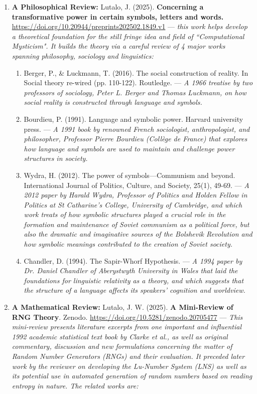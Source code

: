 \documentclass[a4paper]{article}
\begin{document}
\begin{enumerate}
\item{ \textbf{A Philosophical Review:} Lutalo, J. (2025). \textbf{Concerning a transformative power in certain symbols, letters and words.} \url{https://doi.org/10.20944/preprints202502.1849.v1} --- \textit{this work helps develop a theoretical foundation for the still fringe idea and field of ``Computational Mysticism". It builds the theory via a careful review of 4 major works spanning philosophy, sociology and linguistics:}
\begin{enumerate}
\item Berger, P., \& Luckmann, T. (2016). The social construction of reality. In Social theory re-wired (pp. 110-122). Routledge. --- \textit{A 1966 treatise by two professors of sociology, Peter L.
Berger and Thomas Luckmann, on how social reality is constructed through language and symbols.}
\item Bourdieu, P. (1991). Language and symbolic power. Harvard university press. --- \textit{A 1991 book by renowned French sociologist, anthropologist, and philosopher, Professor Pierre Bourdieu (Collège de France) that explores how language and symbols are used to maintain and challenge power structures in society.}
\item Wydra, H. (2012). The power of symbols—Communism and beyond. International Journal of Politics, Culture, and Society, 25(1), 49-69. --- \textit{A 2012 paper by Harald
Wydra, Professor of Politics and Holden Fellow in Politics at St Catharine’s College, University of
Cambridge, and which work treats of how symbolic structures played a crucial role in the formation and
maintenance of Soviet communism as a political force, but also the dramatic and imaginative
sources of the Bolshevik Revolution and how symbolic meanings contributed to the creation of Soviet society.}
\item Chandler, D. (1994). The Sapir-Whorf Hypothesis. --- \textit{A 1994 paper by Dr. Daniel Chandler
of Aberystwyth University in Wales that laid the foundations for linguistic relativity as a theory, and which suggests that the structure of a language affects its speakers’ cognition and worldview.}
\end{enumerate}
}
\item{ \textbf{A Mathematical Review:} Lutalo, J. W. (2025). \textbf{A Mini-Review of RNG Theory}. Zenodo. \url{https://doi.org/10.5281/zenodo.20705477} --- \textit{This mini-review presents literature excerpts from one important and influential 1992 academic statistical text book by Clarke et al., as well as original commentary, discussion and new formulations concerning the matter of Random Number Generators (RNGs) and their evaluation. It preceded later work by the reviewer on developing the Lu-Number System (LNS) as well as its potential use in automated generation of random numbers based on reading entropy in nature. The related works are:}
}
\end{enumerate}
\end{document}
